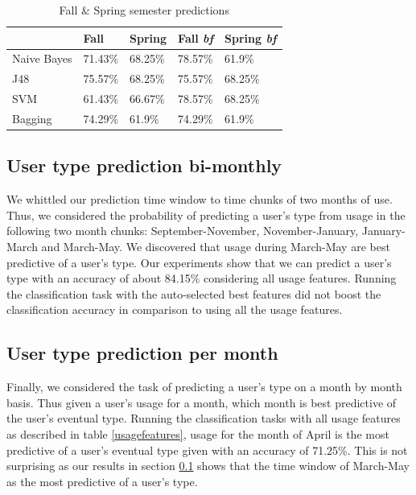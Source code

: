 \documentclass{acm_proc_article-sp}
\begin{document}
\begin{table}

\caption{Fall \& Spring semester predictions}
\label{semesterprediction}
\begin{tabular}{|l|l|l||l|l|}
	\hline
	 & \textbf{Fall} & \textbf{Spring} & \textbf{Fall \textit{bf}} & \textbf{Spring \textit{bf}}\\ \hline
    Naive Bayes & 71.43\% & 68.25\% & 78.57\%  & 61.9\%\\ \hline
    J48 & 75.57\% & 68.25\% & 75.57\%  &  68.25\% \\ \hline
    SVM & 61.43\% & 66.67\% & 78.57\% & 68.25\%  \\ \hline
	Bagging & 74.29\% & 61.9\%  & 74.29\%  & 61.9\%\\ \hline

\end{tabular}
\end{table}

\subsection{User type prediction bi-monthly} \label{usertypepredictionbimonthly}
We whittled our prediction time window to time chunks of two months of use. Thus, we considered the probability of predicting a user's type from usage in the following two month chunks: September-November, November-January, January-March and March-May. We discovered that usage during March-May are best predictive of a user's type. Our experiments show that we can predict a user's type with an accuracy of about 84.15\% considering all usage features. Running the classification task with the auto-selected best features did not boost the classification accuracy in comparison to using all the usage features.

\subsection{User type prediction per month}
Finally, we considered the task of predicting a user's type on a month by month basis. Thus given a user's usage for a month, which month is best predictive of the user's eventual type. Running the classification tasks with all usage features as described in table \ref{usagefeatures}, usage for the month of April is the most predictive of a user's eventual type given with an accuracy of 71.25\%. This is not surprising as our results in section \ref{usertypepredictionbimonthly} shows that the time window of March-May as the most predictive of a user's type.
\end{document}
